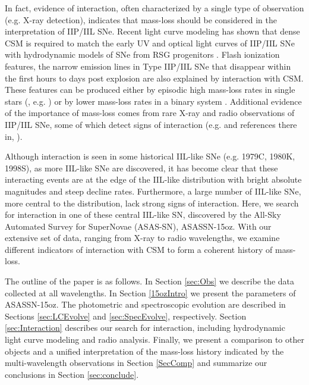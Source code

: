 \documentclass[a4paper,fleqn,usenatbib]{mnras}
\begin{document}
In fact, evidence of interaction, often characterized by a single type of observation (e.g. X-ray detection), indicates that mass-loss should be considered in the interpretation of IIP/IIL SNe.
Recent light curve modeling has shown that dense CSM is required to match the early UV and optical light curves of IIP/IIL SNe with hydrodynamic models of SNe from RSG progenitors \citep{2015gezari,2018morozova,2018paxton,2018foerster}.  
Flash ionization features, the narrow emission lines in Type IIP/IIL SNe that disappear within the first hours to days post explosion are also explained by interaction with CSM. 
These features can be produced either by episodic high mass-loss rates in single stars (\citealt{2014gal-yam}, e.g. \citealt{ 2017yaron}) or by lower mass-loss rates in a binary system \citep{2018kochanek}.
Additional evidence of the importance of mass-loss comes from rare X-ray and radio observations of IIP/IIL SNe, some of which detect signs of interaction (e.g. \citealt{2014dwarkadas} and references there in, \citealt{2018morozova2}).

Although interaction is seen in some historical IIL-like SNe (e.g. 1979C, 1980K, 1998S), as more IIL-like SNe are discovered, it has become clear that these interacting events are at the edge of the IIL-like distribution with bright absolute magnitudes and steep decline rates. 
Furthermore, a large number of IIL-like SNe, more central to the distribution, lack strong signs of interaction.
Here, we search for interaction in one of these central IIL-like SN, discovered by the All-Sky Automated Survey for SuperNovae (ASAS-SN), ASASSN-15oz.
With our extensive set of data, ranging from X-ray to radio wavelengths, we examine different indicators of interaction with CSM to form a coherent history of mass-loss.

The outline of the paper is as follows.
In Section \ref{sec:Obs} we describe the data collected at all wavelengths.
In Section \ref{15ozIntro} we present the parameters of ASASSN-15oz.
The photometric and spectroscopic evolution are described in Sections \ref{sec:LCEvolve} and \ref{sec:SpecEvolve}, respectively.
Section \ref{sec:Interaction} describes our search for interaction, including hydrodynamic light curve modeling and radio analysis.
Finally, we present a comparison to other objects and a unified interpretation of the mass-loss history indicated by the multi-wavelength observations  in Section \ref{SecComp} and summarize our conclusions in Section \ref{sec:conclude}.
\end{document}
